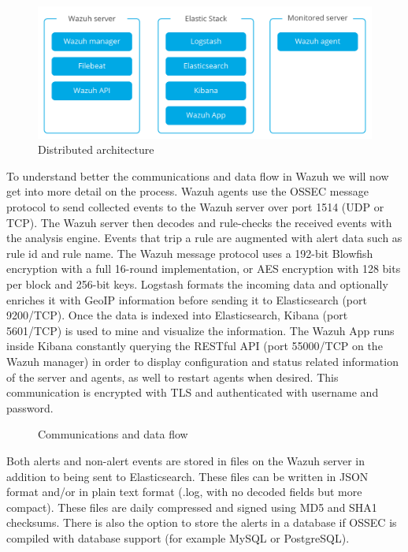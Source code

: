\begin{figure}[H]
  \centering
	\includegraphics[width=\textwidth]{figuras/wazuh_distributed.png}
	\caption{Distributed architecture}
\end{figure}
\linej
To understand better the communications and data flow in Wazuh we will now get into more detail on the process\cite{wazuh_architecture2}\cite{wazuh_data_flow}.
\linej
\linej
Wazuh agents use the OSSEC message protocol to send collected events to the Wazuh server over port 1514 (UDP or TCP). The Wazuh server then decodes and rule-checks the received events with the analysis engine. Events that trip a rule are augmented with alert data such as rule id and rule name. The Wazuh message protocol uses a 192-bit Blowfish encryption with a full 16-round implementation, or AES encryption with 128 bits per block and 256-bit keys.
\linej
Logstash formats the incoming data and optionally enriches it with GeoIP information before sending it to Elasticsearch (port 9200/TCP). Once the data is indexed into Elasticsearch, Kibana (port 5601/TCP) is used to mine and visualize the information.
\linej
The Wazuh App runs inside Kibana constantly querying the RESTful API (port 55000/TCP on the Wazuh manager) in order to display configuration and status related information of the server and agents, as well to restart agents when desired. This communication is encrypted with TLS and authenticated with username and password.

\begin{figure}[H]
  \centering
	\caption{Communications and data flow}
\end{figure}
\linej
Both alerts and non-alert events are stored in files on the Wazuh server in addition to being sent to Elasticsearch. These files can be written in JSON format and/or in plain text format (.log, with no decoded fields but more compact). These files are daily compressed and signed using MD5 and SHA1 checksums.
There is also the option to store the alerts in a database if OSSEC is compiled with database support (for example MySQL or PostgreSQL)\cite{libro_ossec}.

